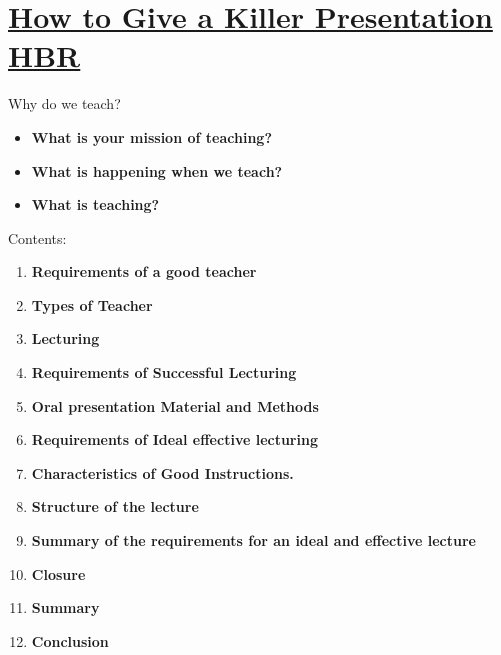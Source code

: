 \documentclass[
  ignorenonframetext,
]{beamer}
\begin{document}
\hypertarget{how-to-give-a-killer-presentation-hbr}{%
\section{\texorpdfstring{{\href{https://hbr.org/2013/06/how-to-give-a-killer-presentation}{How
to Give a Killer Presentation
HBR}}}{How to Give a Killer Presentation HBR}}\label{how-to-give-a-killer-presentation-hbr}}

\begin{frame}{}
\protect\hypertarget{section-1}{}
\end{frame}

\begin{frame}{}
\protect\hypertarget{section-2}{}
\end{frame}

\begin{frame}{Why do we teach?}
\protect\hypertarget{why-do-we-teach}{}
\begin{itemize}[<+->]
\item
  \textbf{What is your mission of teaching?}
\item
  \textbf{What is happening when we teach?}
\item
  \textbf{What is teaching?}
\end{itemize}
\end{frame}

\begin{frame}{Contents:}
\protect\hypertarget{contents}{}
\begin{enumerate}[<+->]
\item
  \textbf{Requirements of a good teacher}
\item
  \textbf{Types of Teacher}
\item
  \textbf{Lecturing}
\item
  \textbf{Requirements of Successful Lecturing}
\item
  \textbf{Oral presentation Material and Methods}
\item
  \textbf{Requirements of Ideal effective lecturing}
\item
  \textbf{Characteristics of Good Instructions.}
\end{enumerate}
\end{frame}

\begin{frame}{}
\protect\hypertarget{section-3}{}
\begin{enumerate}[<+->]
\setcounter{enumi}{7}
\item
  \textbf{Structure of the lecture}
\item
  \textbf{Summary of the requirements for an ideal and effective
  lecture}
\item
  \textbf{Closure}
\item
  \textbf{Summary}
\item
  \textbf{Conclusion}
\end{enumerate}
\end{frame}
\end{document}
